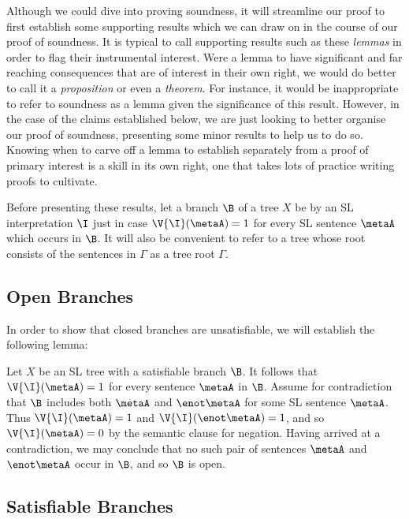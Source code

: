 Although we could dive into proving soundness, it will streamline our proof to first establish some supporting results which we can draw on in the course of our proof of soundness.
It is typical to call supporting results such as these \textit{lemmas} in order to flag their instrumental interest.
Were a lemma to have significant and far reaching consequences that are of interest in their own right, we would do better to call it a \textit{proposition} or even a \textit{theorem}.
For instance, it would be inappropriate to refer to soundness as a lemma given the significance of this result.
However, in the case of the claims established below, we are just looking to better organise our proof of soundness, presenting some minor results to help us to do so.
Knowing when to carve off a lemma to establish separately from a proof of primary interest is a skill in its own right, one that takes lots of practice writing proofs to cultivate.

Before presenting these results, let a branch $\B$ of a tree $X$ be  by an SL interpretation $\I$ just in case $\V{\I}(\metaA)=1$ for every SL sentence $\metaA$ which occurs in $\B$.
It will also be convenient to refer to a tree whose root consists of the sentences in $\Gamma$ as a tree  root $\Gamma$.



\subsection{Open Branches}

In order to show that closed branches are unsatisfiable, we will establish the following lemma:

\label{OpenBranchLemma}

Let $X$ be an SL tree with a satisfiable branch $\B$.
It follows that $\V{\I}(\metaA)=1$ for every sentence $\metaA$ in $\B$.
Assume for contradiction that $\B$ includes both $\metaA$ and $\enot \metaA$ for some SL sentence $\metaA$.
Thus $\V{\I}(\metaA)=1$ and $\V{\I}(\enot\metaA)=1$, and so $\V{\I}(\metaA)=0$ by the semantic clause for negation.
Having arrived at a contradiction, we may conclude that no such pair of sentences $\metaA$ and $\enot \metaA$ occur in $\B$, and so $\B$ is open. 






\subsection{Satisfiable Branches}

